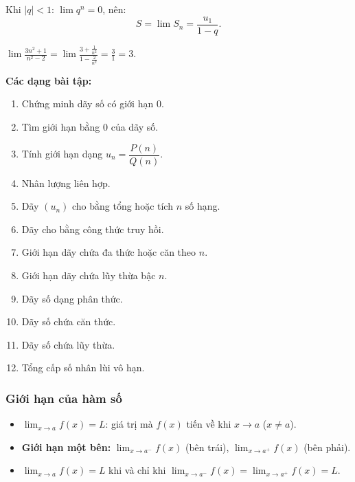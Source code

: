 \documentclass[12pt,a4paper]{article}
\begin{document}
\begin{congthuc}[title={Cấp số nhân lùi vô hạn}]
  Khi $|q| < 1$: \;$\lim q^n = 0$, nên:
  \[
    S = \lim S_n = \frac{u_1}{1 - q}.
  \]
\end{congthuc}

\begin{vidu}
  $\displaystyle\lim \frac{3n^2 + 1}{n^2 - 2}
  = \lim \frac{3 + \frac{1}{n^2}}{1 - \frac{2}{n^2}}
  = \frac{3}{1} = 3.$
\end{vidu}

\medskip\noindent\textbf{Các dạng bài tập:}
\begin{enumerate}[label=\textbf{Dạng \arabic*:}, leftmargin=*, align=left]
  \item Chứng minh dãy số có giới hạn $0$.
  \item Tìm giới hạn bằng $0$ của dãy số.
  \item Tính giới hạn dạng $u_n = \dfrac{P(n)}{Q(n)}$.
  \item Nhân lượng liên hợp.
  \item Dãy $(u_n)$ cho bằng tổng hoặc tích $n$ số hạng.
  \item Dãy cho bằng công thức truy hồi.
  \item Giới hạn dãy chứa đa thức hoặc căn theo $n$.
  \item Giới hạn dãy chứa lũy thừa bậc $n$.
  \item Dãy số dạng phân thức.
  \item Dãy số chứa căn thức.
  \item Dãy số chứa lũy thừa.
  \item Tổng cấp số nhân lùi vô hạn.
\end{enumerate}

\subsubsection{Giới hạn của hàm số}

\begin{dinhnghia}
  \begin{itemize}
    \item $\displaystyle\lim_{x \to a} f(x) = L$: giá trị mà $f(x)$ tiến về khi $x \to a$ \;($x \ne a$).
    \item \textbf{Giới hạn một bên:}
      $\displaystyle\lim_{x \to a^-} f(x)$ (bên trái), \quad
      $\displaystyle\lim_{x \to a^+} f(x)$ (bên phải).
    \item $\displaystyle\lim_{x \to a} f(x) = L$ khi và chỉ khi
      $\displaystyle\lim_{x \to a^-} f(x) = \lim_{x \to a^+} f(x) = L$.
  \end{itemize}
\end{dinhnghia}
\end{document}
